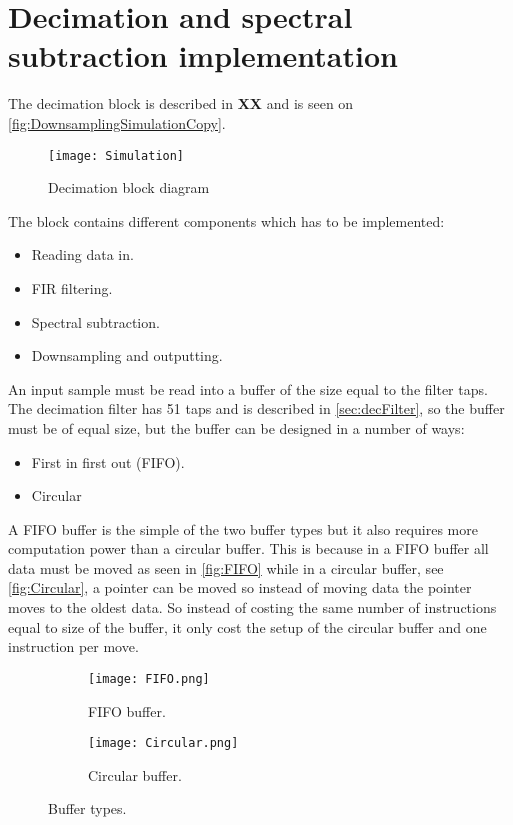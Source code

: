 \section{Decimation and spectral subtraction implementation}
The decimation block is described in \textbf{XX} and is seen on \autoref{fig:DownsamplingSimulationCopy}.
\begin{figure}[H]
    \centering
	\texttt{[image: Simulation]}
    \caption{Decimation block diagram}
    \label{fig:DownsamplingSimulationCopy}
\end{figure}
The block contains different components which has to be implemented:
\begin{itemize}
\item Reading data in.
\item FIR filtering.
\item Spectral subtraction.
\item Downsampling and outputting. 
\end{itemize}
An input sample must be read into a buffer of the size equal to the filter taps. The decimation filter has 51 taps and is described in \autoref{sec:decFilter}, so the buffer must be of equal size, but the buffer can be designed in a number of ways:
\begin{itemize}
\item First in first out (FIFO).
\item Circular
\end{itemize} 
A FIFO buffer is the simple of the two buffer types but it also requires more computation power than a circular buffer. This is because in a FIFO buffer all data must be moved as seen in \autoref{fig:FIFO} while in a circular buffer, see \autoref{fig:Circular}, a pointer can be moved so instead of moving data the pointer moves to the oldest data. So instead of costing the same number of instructions equal to size of the buffer, it only cost the setup of the circular buffer and one instruction per move.   
\begin{figure}[H]
\centering
\begin{subfigure}[t]{0.49\textwidth}
    \centering
	\texttt{[image: FIFO.png]}
	\label{fig:FIFO}
	\caption{FIFO buffer.}
\end{subfigure}
\begin{subfigure}[t]{0.49\textwidth}
    \centering
	\texttt{[image: Circular.png]}
	\label{fig:Circular}
	\caption{Circular buffer.}
\end{subfigure}
\caption{Buffer types.}
\label{fig:bufTypes}
\end{figure}
